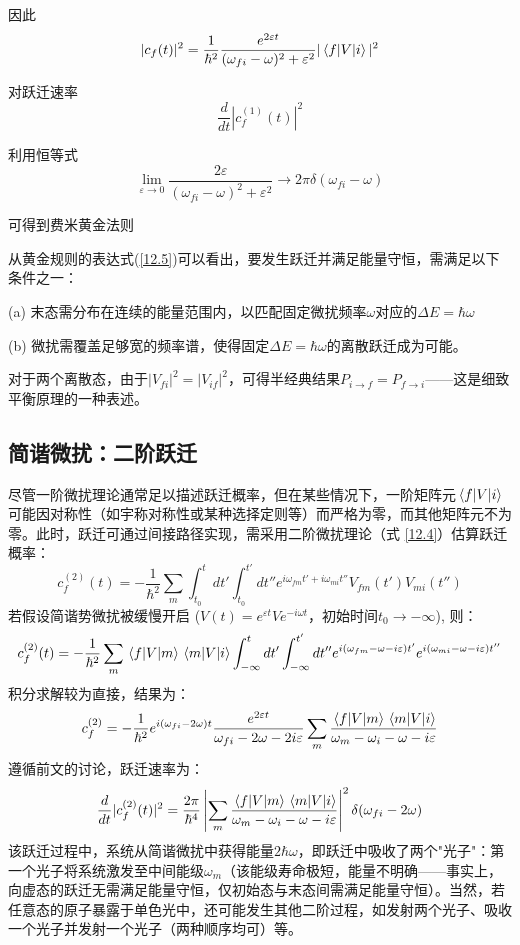 因此
\[|c_f(t)|^2=\frac{1}{\hbar^2}\frac{e^{2\varepsilon t}}{(\omega_{fi}-\omega)^2+\varepsilon^2}|\matrixel{f}{V}{i}|^2\]

对跃迁速率\[\frac{d}{dt}|c_f^{(1)}(t)|^2\]

利用恒等式\[\lim_{\varepsilon\to0}\frac{2\varepsilon}{(\omega_{fi}-\omega)^2+\varepsilon^2}\to2\pi\delta(\omega_{fi}-\omega)\]

可得到费米黄金法则

从黄金规则的表达式(\ref{12.5})可以看出，要发生跃迁并满足能量守恒，需满足以下条件之一：

(a) 末态需分布在连续的能量范围内，以匹配固定微扰频率$\omega$对应的$\Delta E=\hbar\omega$

(b) 微扰需覆盖足够宽的频率谱，使得固定$\Delta E=\hbar\omega$的离散跃迁成为可能。

对于两个离散态，由于$|V_{fi}|^2=|V_{if}|^2$，可得半经典结果$P_{i\to f}=P_{f\to i}$——这是细致平衡原理的一种表述。

\subsection{简谐微扰：二阶跃迁}
尽管一阶微扰理论通常足以描述跃迁概率，但在某些情况下，一阶矩阵元$\matrixel{f}{V}{i}$可能因对称性（如宇称对称性或某种选择定则等）而严格为零，而其他矩阵元不为零。此时，跃迁可通过间接路径实现，需采用二阶微扰理论（式 \ref{12.4}）估算跃迁概率：
\begin{equation}
	c_f^{(2)}(t)=-\frac{1}{\hbar^2}\sum_m \int_{t_0}^t dt'\int_{t_0}^{t'} dt'' e^{i\omega_{fm}t'+i\omega_{mi}t''} V_{fm}(t')V_{mi}(t'')
\end{equation}
若假设简谐势微扰被缓慢开启 ($V(t)=e^{\varepsilon t}Ve^{-i\omega t}$，初始时间$t_0\to-\infty$), 则：
\begin{equation}
	c_f^{(2)}(t)=-\frac{1}{\hbar^2}\sum_m \matrixel{f}{V}{m}\matrixel{m}{V}{i} \int_{-\infty}^t dt'\int_{-\infty}^{t'} dt'' e^{i(\omega_{fm}-\omega-i\varepsilon)t'}e^{i(\omega_{mi}-\omega-i\varepsilon)t''}
\end{equation}
积分求解较为直接，结果为：
\begin{equation}
	c_f^{(2)}=-\frac{1}{\hbar^2}e^{i(\omega_{fi}-2\omega)t}\frac{e^{2\varepsilon t}}{\omega_{fi}-2\omega-2i\varepsilon}\sum_m \frac{\matrixel{f}{V}{m}\matrixel{m}{V}{i}}{\omega_m-\omega_i-\omega-i\varepsilon}
\end{equation}
遵循前文的讨论，跃迁速率为：
\begin{equation}
	\frac{d}{dt}|c_f^{(2)}(t)|^2=\frac{2\pi}{\hbar^4}\left|\sum_m \frac{\matrixel{f}{V}{m}\matrixel{m}{V}{i}}{\omega_m-\omega_i-\omega-i\varepsilon}\right|^2\delta(\omega_{fi}-2\omega)
\end{equation}
该跃迁过程中，系统从简谐微扰中获得能量$2\hbar\omega$，即跃迁中吸收了两个"光子"：第一个光子将系统激发至中间能级$\omega_m$（该能级寿命极短，能量不明确——事实上，向虚态的跃迁无需满足能量守恒，仅初始态与末态间需满足能量守恒）。当然，若任意态的原子暴露于单色光中，还可能发生其他二阶过程，如发射两个光子、吸收一个光子并发射一个光子（两种顺序均可）等。